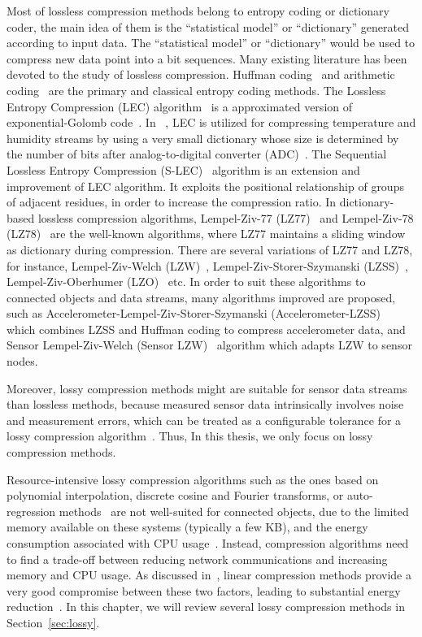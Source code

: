 Most of lossless compression methods belong to entropy coding or dictionary
coder, the main idea of them is the ``statistical model'' or ``dictionary''
generated according to input data. The ``statistical model'' or ``dictionary''
would be used to compress new data point into a bit sequences.  Many existing
literature has been devoted to the study of lossless compression. Huffman
coding~\cite{huffman1952method} and arithmetic
coding~\cite{langdon1984introduction} are the primary and classical entropy
coding methods. The Lossless Entropy Compression (LEC)
algorithm~\cite{marcelloni2008simple} is a approximated version of
exponential-Golomb code~\cite{teuhola1978compression}. In
~\cite{marcelloni2008simple}, LEC is utilized for compressing temperature and
humidity streams by using a very small dictionary whose size is determined by
the number of bits after analog-to-digital converter
(ADC)~\cite{marcelloni2008simple,marcelloni2009efficient}. The Sequential
Lossless Entropy Compression (S-LEC)~\cite{li2016temporal} algorithm is an
extension and improvement of LEC algorithm. It exploits the positional
relationship of groups of adjacent residues, in order to increase the
compression ratio. In dictionary-based lossless compression algorithms,
Lempel-Ziv-77 (LZ77)~\cite{ziv1977universal} and Lempel-Ziv-78
(LZ78)~\cite{ziv1978compression} are the well-known algorithms, where LZ77
maintains a sliding window as dictionary during compression. There are several
variations of LZ77 and LZ78, for instance, Lempel-Ziv-Welch
(LZW)~\cite{sadler2006data}, Lempel-Ziv-Storer-Szymanski
(LZSS)~\cite{storer1982data}, Lempel-Ziv-Oberhumer (LZO)~\cite{lzocite} etc. In
order to suit these algorithms to connected objects and data streams, many
algorithms improved are proposed, such as
Accelerometer-Lempel-Ziv-Storer-Szymanski
(Accelerometer-LZSS)~\cite{pope2018accelerometer} which combines LZSS and
Huffman coding to compress accelerometer data, and Sensor Lempel-Ziv-Welch
(Sensor LZW)~\cite{sadler2006data} algorithm which adapts LZW to sensor nodes.

Moreover, lossy compression methods might are suitable for sensor data streams
than lossless methods, because measured sensor data intrinsically involves noise
and measurement errors, which can be treated as a configurable tolerance for a
lossy compression algorithm~\cite{li2018multi}. Thus, In this thesis, we only
focus on lossy compression methods.

Resource-intensive lossy compression algorithms such as the ones based on
polynomial interpolation, discrete cosine and Fourier transforms, or
auto-regression methods~\cite{lu2010optimized} are not well-suited for connected
objects, due to the limited memory available on these systems (typically a few
KB), and the energy consumption associated with CPU usage~\cite{li2018multi}.
Instead, compression algorithms need to find a trade-off between reducing
network communications and increasing memory and CPU usage. As discussed
in~\cite{zordan2014performance}, linear compression methods provide a very good
compromise between these two factors, leading to substantial energy
reduction~\cite{li2018multi}. In this chapter, we will review several lossy
compression methods in Section~\ref{sec:lossy}.
